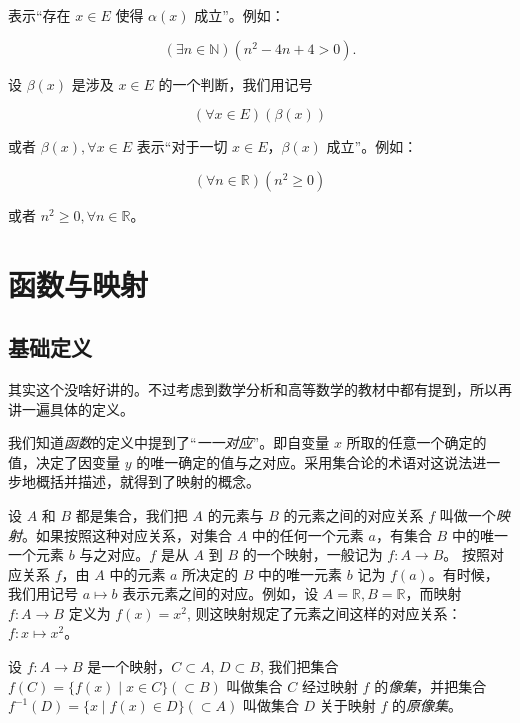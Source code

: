 \documentclass[lang=cn,10pt]{elegantbook}
\begin{document}
表示“存在 $x \in E$ 使得 $\alpha(x)$ 成立”。例如：

\begin{equation*}
  (\exists n \in \mathbb{N})(n^2 -4n + 4 > 0).
\end{equation*}

设 $\beta(x)$ 是涉及 $x \in E$ 的一个判断，我们用记号

\begin{equation*}
  (\forall x \in E)(\beta(x))
\end{equation*}

或者 $\beta(x), \forall x \in E$ 表示“对于一切 $x \in E$，$\beta(x)$ 成立”。例如：

\begin{equation*}
  (\forall n \in \mathbb{R})(n^2 \geq 0)
\end{equation*}

或者 $n^2 \geq 0, \forall n \in \mathbb{R}$。

\section{函数与映射}

\subsection{基础定义}

其实这个没啥好讲的。不过考虑到数学分析和高等数学的教材中都有提到，所以再讲一遍具体的定义。

我们知道\emph{函数}的定义中提到了“\emph{一一对应}”。即自变量 $x$ 所取的任意一个确定的值，决定了因变量 $y$ 的唯一确定的值与之对应。采用集合论的术语对这说法进一步地概括并描述，就得到了映射的概念。

设 $A$ 和 $B$ 都是集合，我们把 $A$ 的元素与 $B$ 的元素之间的对应关系 $f$ 叫做一个\emph{映射}。如果按照这种对应关系，对集合 $A$ 中的任何一个元素 $a$，有集合 $B$ 中的唯一一个元素 $b$ 与之对应。$f$ 是从 $A$ 到 $B$ 的一个映射，一般记为 $f:A\rightarrow B$。
按照对应关系 $f$，由 $A$ 中的元素 $a$ 所决定的 $B$ 中的唯一元素 $b$ 记为 $f(a)$。有时候，我们用记号 $a \mapsto b$ 表示元素之间的对应。例如，设 $A=\mathbb R, B = \mathbb R$，而映射 $f: A \rightarrow B$ 定义为 $f(x) = x^2$, 则这映射规定了元素之间这样的对应关系：$f: x \mapsto x^2$。


设 $f:A\rightarrow B$ 是一个映射，$C \subset A$, $D \subset B$, 我们把集合 $f(C)=\{f(x) \mid x \in C\}(\subset B)$ 叫做集合 $C$ 经过映射 $f$ 的\emph{像集}，并把集合 $f^{-1}(D)=\{x \mid f(x) \in D\}(\subset A)$ 叫做集合 $D$ 关于映射 $f$ 的\emph{原像集}。
\end{document}
